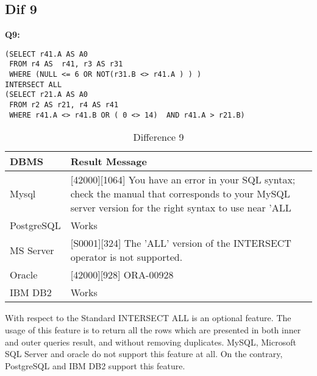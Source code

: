 \subsection{Dif 9}
  
\textbf{Q9:}
\begin{mdframed}[backgroundcolor=lightgray!20]
\begin{lstlisting}[style=SQL]
(SELECT r41.A AS A0
 FROM r4 AS  r41, r3 AS r31
 WHERE (NULL <= 6 OR NOT(r31.B <> r41.A ) ) )
INTERSECT ALL
(SELECT r21.A AS A0
 FROM r2 AS r21, r4 AS r41
 WHERE r41.A <> r41.B OR ( 0 <> 14)  AND r41.A > r21.B)
\end{lstlisting}
\end{mdframed}

 
\begin{table}[h]
\centering
\caption{Difference 9}
\label{my-label}
\begin{tabular}{|p{2cm}|p{11.5cm}| }
\hline
\textbf{DBMS} & \textbf{Result Message}                                                                                                                                          \\ \hline
Mysql         & {[}42000{]}{[}1064{]} You have an error in your SQL syntax; check the manual that corresponds to your MySQL server version for the right syntax to use near 'ALL \\ \hline
PostgreSQL    & Works                                                                                                                                                            \\ \hline
MS Server     & {[}S0001{]}{[}324{]} The 'ALL' version of the INTERSECT operator is not supported.                                                                               \\ \hline
Oracle        & {[}42000{]}{[}928{]} ORA-00928                                                                                                                                   \\ \hline
IBM DB2       & Works                                                                                                                                                            \\ \hline
\end{tabular}
\end{table}

\hfill\newpage
With respect to the Standard INTERSECT ALL is an optional feature. The usage of this feature is to return all the rows which are presented in both inner and outer queries result, and without removing duplicates. MySQL, Microsoft SQL Server and oracle do not support this feature at all. On the contrary, PostgreSQL and IBM DB2 support this feature. 

